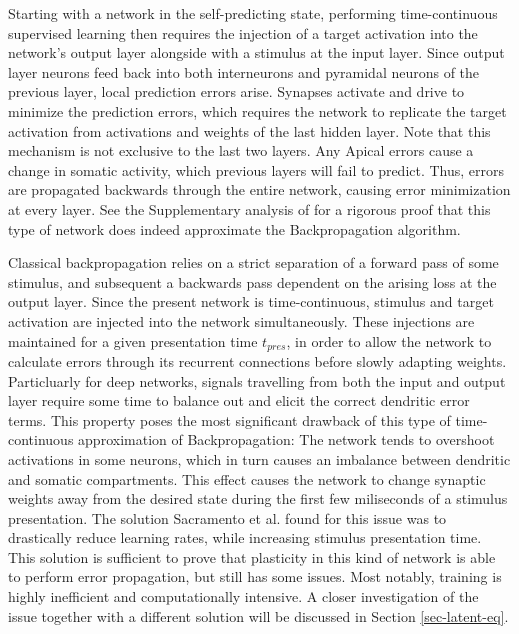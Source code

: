 Starting with a network in the self-predicting state, performing time-continuous supervised learning then requires the
injection of a target activation into the network's output layer alongside with a stimulus at the input layer. Since
output layer neurons feed back into both interneurons and pyramidal neurons of the previous layer, local prediction
errors arise. Synapses activate and drive to minimize the prediction errors, which requires the network to replicate the
target activation from activations and weights of the last hidden layer. Note that this mechanism is not exclusive to
the last two layers. Any Apical errors cause a change in somatic activity, which previous layers will fail to predict.
Thus, errors are propagated backwards through the entire network, causing error minimization at every layer. See the
Supplementary analysis of \cite{sacramento2018dendritic} for a rigorous proof that this type of network does indeed
approximate the Backpropagation algorithm.



Classical backpropagation relies on a strict separation of a forward pass of some stimulus, and subsequent a backwards
pass dependent on the arising loss at the output layer. Since the present network is time-continuous, stimulus and
target activation are injected into the network simultaneously. These injections are maintained for a given presentation
time $t_{pres}$, in order to allow the network to calculate errors through its recurrent connections before slowly
adapting weights. Particluarly for deep networks, signals travelling from both the input and output layer require some
time to balance out and elicit the correct dendritic error terms. This property poses the most significant drawback of
this type of time-continuous approximation of Backpropagation: The network tends to overshoot activations in some
neurons, which in turn causes an imbalance between dendritic and somatic compartments. This effect causes the network to
change synaptic weights away from the desired state during the first few miliseconds of a stimulus presentation. The
solution Sacramento et al. found for this issue was to drastically reduce learning rates, while increasing stimulus
presentation time. This solution is sufficient to prove that plasticity in this kind of network is able to perform error
propagation, but still has some issues. Most notably, training is highly inefficient and computationally intensive. A
closer investigation of the issue together with a different solution will be discussed in Section \ref{sec-latent-eq}.



